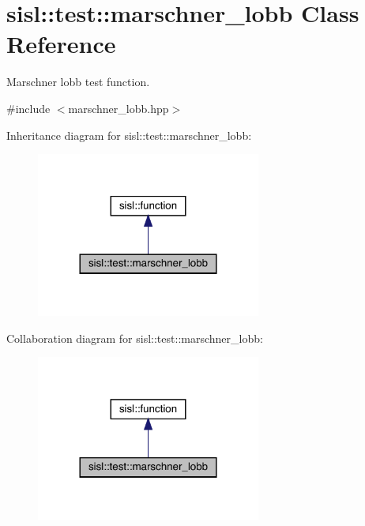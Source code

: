\hypertarget{classsisl_1_1test_1_1marschner__lobb}{}\section{sisl\+:\+:test\+:\+:marschner\+\_\+lobb Class Reference}
\label{classsisl_1_1test_1_1marschner__lobb}


Marschner lobb test function.  




{\ttfamily \#include $<$marschner\+\_\+lobb.\+hpp$>$}



Inheritance diagram for sisl\+:\+:test\+:\+:marschner\+\_\+lobb\+:\nopagebreak
\begin{figure}[H]
\begin{center}
\leavevmode
\includegraphics[width=209pt]{classsisl_1_1test_1_1marschner__lobb__inherit__graph}
\end{center}
\end{figure}


Collaboration diagram for sisl\+:\+:test\+:\+:marschner\+\_\+lobb\+:\nopagebreak
\begin{figure}[H]
\begin{center}
\leavevmode
\includegraphics[width=209pt]{classsisl_1_1test_1_1marschner__lobb__coll__graph}
\end{center}
\end{figure}

